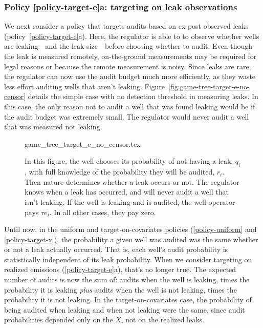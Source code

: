 \documentclass[12pt,oneside,letterpaper]{article}
\theoremstyle{definition}
\begin{document}
\begin{refsection}
\subsubsection{Policy \ref{policy-target-e}a: targeting on leak observations}
\label{sec:audit-target-e-low-threshold}

We next consider a policy that targets audits based on ex-post observed leaks (policy~\ref{policy-target-e}a).
Here, the regulator is able to to observe whether wells are leaking---and the leak size---before choosing whether to audit.
Even though the leak is measured remotely, on-the-ground measurements may be required for legal reasons or because the remote measurement is noisy.
Since leaks are rare, the regulator can now use the audit budget much more efficiently, as they waste less effort auditing wells that aren't leaking.
Figure~\ref{fig:game-tree-target-e-no-censor} details the simple case with no detection threshold in measuring leaks.
In this case, the only reason not to audit a well that was found leaking would be if the audit budget was extremely small.
The regulator would never audit a well that was measured not leaking.

\begin{figure}[!hbt]
{game_tree_target_e_no_censor.tex}


\begin{minipage}{0.75\textwidth}

\begin{justify}
{\small
In this figure, the well chooses its probability of not having a leak, \(q_i\), with full knowledge of the probability they will be audited, \(r_i\).
Then nature determines whether a leak occurs or not.
The regulator knows when a leak has occurred, and will never audit a well that isn't leaking.
If the well is leaking and is audited, the well operator pays \(\tau e_i\).
In all other cases, they pay zero.
}
\end{justify}
\end{minipage}
\end{figure}

Until now, in the uniform and target-on-covariates policies (\ref{policy-uniform} and \ref{policy-target-x}), the probability a given well was audited was the same whether or not a leak actually occurred.
That is, each well's audit probability is statistically independent of its  leak probability.
When we consider targeting on realized emissions (\ref{policy-target-e}a), that's no longer true.
The expected number of audits is now the sum of:
audits when the well is leaking, times the probability it is leaking
\textit{plus}
audits when the well is not leaking, times the probability it is not leaking.
In the target-on-covariates case, the probability of being audited when leaking and when not leaking were the same, since audit probabilities depended only on the \(X\), not on the realized leaks.


\end{refsection}
\end{document}
